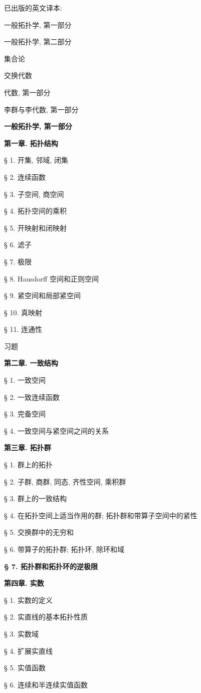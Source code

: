 
已出版的英文译本:

一般拓扑学, 第一部分

一般拓扑学, 第二部分

集合论

交换代数

代数, 第一部分

李群与李代数, 第一部分

\textbf{一般拓扑学, 第一部分}

\textbf{第一章. 拓扑结构}

§ 1. 开集, 邻域, 闭集

§ 2. 连续函数

§ 3. 子空间, 商空间

§ 4. 拓扑空间的乘积

§ 5. 开映射和闭映射

§ 6. 滤子

§ 7. 极限

§ 8. Hausdorff 空间和正则空间

§ 9. 紧空间和局部紧空间

§ 10. 真映射

§ 11. 连通性

习题

\textbf{第二章. 一致结构}

§ 1. 一致空间

§ 2. 一致连续函数

§ 3. 完备空间

§ 4. 一致空间与紧空间之间的关系

\textbf{第三章. 拓扑群}

§ 1. 群上的拓扑

§ 2. 子群, 商群, 同态, 齐性空间, 乘积群

§ 3. 群上的一致结构

§ 4. 在拓扑空间上适当作用的群; 拓扑群和带算子空间中的紧性

§ 5. 交换群中的无穷和

§ 6. 带算子的拓扑群; 拓扑环, 除环和域

\textbf{§ 7. 拓扑群和拓扑环的逆极限}

\textbf{第四章. 实数}

§ 1. 实数的定义

§ 2. 实直线的基本拓扑性质

§ 3. 实数域

§ 4. 扩展实直线

§ 5. 实值函数

§ 6. 连续和半连续实值函数

